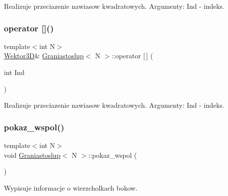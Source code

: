 Realizuje przeciazenie nawiasow kwadratowych. Argumenty\+: Ind -\/ indeks. \mbox{\label{class_graniastoslup_a418130dab87451971818f266d45794a4}} 
\subsubsection{\texorpdfstring{operator []()}{operator []()}\hspace{0.1cm}{\footnotesize\ttfamily [2/2]}}
{\footnotesize\ttfamily template$<$int N$>$ \\
\mbox{\hyperlink{class_wektor}{Wektor3D}}\& \mbox{\hyperlink{class_graniastoslup}{Graniastoslup}}$<$ N $>$\+::operator \mbox{[}$\,$\mbox{]} (\begin{DoxyParamCaption}\item[{int}]{Ind }\end{DoxyParamCaption})\hspace{0.3cm}{\ttfamily [inline]}}

Realizuje przeciazenie nawiasow kwadratowych. Argumenty\+: Ind -\/ indeks. \mbox{\label{class_graniastoslup_a875091773ddc3f77f03d44829ce211e6}} 
\subsubsection{\texorpdfstring{pokaz\_wspol()}{pokaz\_wspol()}}
{\footnotesize\ttfamily template$<$int N$>$ \\
void \mbox{\hyperlink{class_graniastoslup}{Graniastoslup}}$<$ N $>$\+::pokaz\+\_\+wspol (\begin{DoxyParamCaption}{ }\end{DoxyParamCaption})\hspace{0.3cm}{\ttfamily [inline]}}

Wypisuje informacje o wierzcholkach bokow. \mbox{\label{class_graniastoslup_a04c0502602c08af631400dac59c341c6}} 
